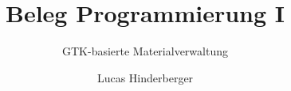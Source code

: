 \documentclass[a4paper]{scrartcl}
\begin{document}
\author{Lucas Hinderberger}
\title{Beleg Programmierung I}
\subtitle{GTK-basierte Materialverwaltung}

\maketitle
\newpage

\tableofcontents
\newpage










\end{document}
